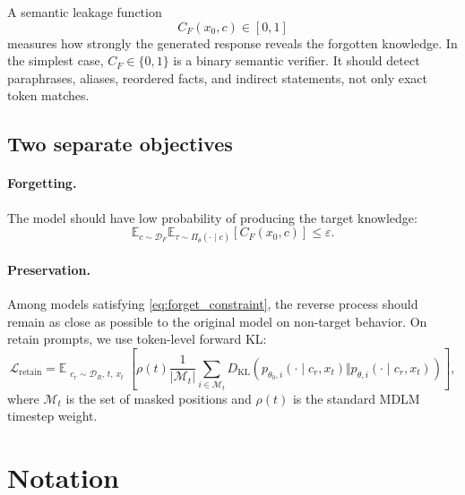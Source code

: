 \documentclass[10pt]{article}
\newcommand{\E}{\mathbb{E}}
\newcommand{\KL}{D_{\mathrm{KL}}}
\newcommand{\DF}{\mathcal{D}_{F}}
\newcommand{\DR}{\mathcal{D}_{R}}
\newcommand{\M}{\mathcal{M}}
\newcommand{\1}{\mathbb{I}}
\begin{document}
A semantic leakage function
\begin{equation}
C_F(x_0,c)\in[0,1]
\end{equation}
measures how strongly the generated response reveals the forgotten knowledge. In the simplest case, $C_F\in\{0,1\}$ is a binary semantic verifier. It should detect paraphrases, aliases, reordered facts, and indirect statements, not only exact token matches.

\subsection{Two separate objectives}

\paragraph{Forgetting.}
The model should have low probability of producing the target knowledge:
\begin{equation}
\E_{c\sim\DF}
\E_{\tau\sim\Pi_\theta(\cdot\mid c)}
[C_F(x_0,c)]
\leq \varepsilon.
\label{eq:forget_constraint}
\end{equation}

\paragraph{Preservation.}
Among models satisfying \cref{eq:forget_constraint}, the reverse process should remain as close as possible to the original model on non-target behavior. On retain prompts, we use token-level forward KL:
\begin{equation}
\mathcal{L}_{\mathrm{retain}}
=
\E_{\substack{c_r\sim\DR,\,t,\,x_t}}
\left[
\rho(t)\frac{1}{|\M_t|}
\sum_{i\in\M_t}
\KL\!\left(
 p_{\theta_0,i}(\cdot\mid c_r,x_t)
 \Vert
 p_{\theta,i}(\cdot\mid c_r,x_t)
\right)
\right],
\label{eq:retain_loss}
\end{equation}
where $\M_t$ is the set of masked positions and $\rho(t)$ is the standard MDLM timestep weight.

\section{Notation}
\end{document}
